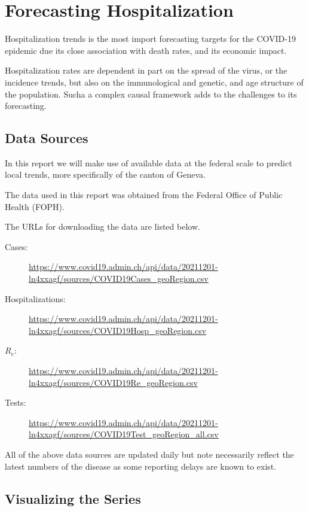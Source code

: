 \documentclass[11pt]{article}
\begin{document}
    \hypertarget{estimating-hospitalization-risk}{%
\section{Forecasting Hospitalization}\label{estimating-hospitalization-risk}}

Hospitalization trends is the most import forecasting targets for the COVID-19 epidemic due its close association with death rates, and its economic impact. 

Hospitalization rates are dependent in part on the spread of the virus, or the incidence trends, but also on the immunological and genetic, and age structure of the population. Sucha a complex causal framework adds to the challenges to its forecasting.

    \hypertarget{getting-the-data-from-foph}{%
\subsection{Data Sources}
\label{getting-the-data-from-foph}}

In this report we will make use of available data at the federal scale to predict local trends, more specifically of the canton of Geneva.

The data used in this report was obtained from the Federal Office of Public Health (FOPH). 

The URLs for downloading the data are listed below.

\begin{description}
 \item [Cases:] \url{https://www.covid19.admin.ch/api/data/20211201-ln4xxagf/sources/COVID19Cases_geoRegion.csv}
 \item [Hospitalizations:] \url{https://www.covid19.admin.ch/api/data/20211201-ln4xxagf/sources/COVID19Hosp_geoRegion.csv}
 \item [$R_e$:] \url{https://www.covid19.admin.ch/api/data/20211201-ln4xxagf/sources/COVID19Re_geoRegion.csv}
 \item [Tests:] \url{https://www.covid19.admin.ch/api/data/20211201-ln4xxagf/sources/COVID19Test_geoRegion_all.csv}
\end{description}

All of the above data sources are updated daily but note necessarily reflect the latest numbers of the disease as some reporting delays are known to exist.
    
    
    \hypertarget{visualizing-the-series}{%
\subsection{Visualizing the Series}\label{visualizing-the-series}}
\end{document}
